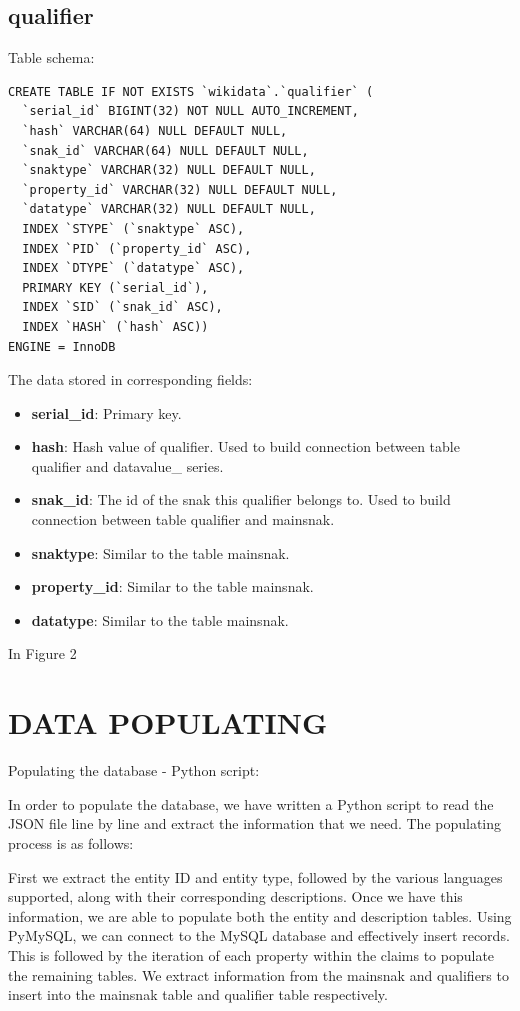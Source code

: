 \documentclass[12pt]{article}
\begin{document}
\subsection{qualifier}
\lstset{language=SQL}
Table schema:
\begin{lstlisting}
CREATE TABLE IF NOT EXISTS `wikidata`.`qualifier` (
  `serial_id` BIGINT(32) NOT NULL AUTO_INCREMENT,
  `hash` VARCHAR(64) NULL DEFAULT NULL,
  `snak_id` VARCHAR(64) NULL DEFAULT NULL,
  `snaktype` VARCHAR(32) NULL DEFAULT NULL,
  `property_id` VARCHAR(32) NULL DEFAULT NULL,
  `datatype` VARCHAR(32) NULL DEFAULT NULL,
  INDEX `STYPE` (`snaktype` ASC),
  INDEX `PID` (`property_id` ASC),
  INDEX `DTYPE` (`datatype` ASC),
  PRIMARY KEY (`serial_id`),
  INDEX `SID` (`snak_id` ASC),
  INDEX `HASH` (`hash` ASC))
ENGINE = InnoDB
\end{lstlisting}
The data stored in corresponding fields:
\begin{itemize}
\item \textbf{serial\_id}: Primary key.
\item \textbf{hash}: Hash value of qualifier. Used to build connection between table qualifier and datavalue\_ series.
\item \textbf{snak\_id}: The id of the snak this qualifier belongs to. Used to build connection between table qualifier and mainsnak.
\item \textbf{snaktype}: Similar to the table mainsnak.
\item \textbf{property\_id}: Similar to the table mainsnak.
\item \textbf{datatype}: Similar to the table mainsnak.
\end{itemize}
In Figure 2
\section{DATA POPULATING}
Populating the database - Python script:

In order to populate the database, we have written a Python script to read the JSON file line by line and extract the information that we need. The populating process is as follows:

First we extract the entity ID and entity type, followed by the various languages supported, along with their corresponding descriptions. Once we have this information, we are able to populate both the entity and description tables. Using PyMySQL, we can connect to the MySQL database and effectively insert records. This is followed by the iteration of each property within the claims to populate the remaining tables. We extract information from the mainsnak and qualifiers to insert into the mainsnak table and qualifier table respectively.
\end{document}
